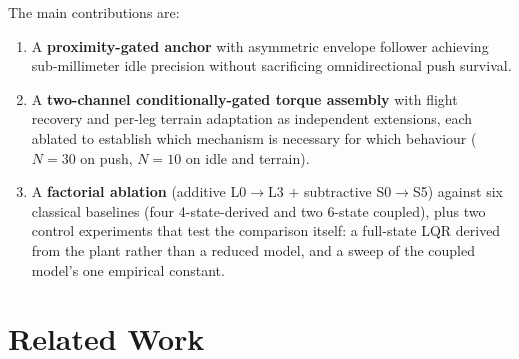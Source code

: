\documentclass[a4paper,fleqn]{cas-dc}
\begin{document}
The main contributions are:
\begin{enumerate}
    \item A \textbf{proximity-gated anchor} with asymmetric envelope follower achieving sub-millimeter idle precision without sacrificing omnidirectional push survival.
    \item A \textbf{two-channel conditionally-gated torque assembly} with flight recovery and per-leg terrain adaptation as independent extensions, each ablated to establish which mechanism is necessary for which behaviour ($N{=}30$ on push, $N{=}10$ on idle and terrain).
    \item A \textbf{factorial ablation} (additive L0$\rightarrow$L3 $+$ subtractive S0$\rightarrow$S5) against six classical baselines (four 4-state-derived and two 6-state coupled), plus two control experiments that test the comparison itself: a full-state LQR derived from the plant rather than a reduced model, and a sweep of the coupled model's one empirical constant.
\end{enumerate}


\section{Related Work}
\end{document}
